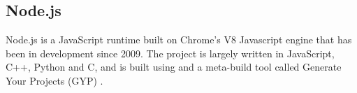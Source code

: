 
















\subsection{Node.js}
\label{sec:eval:node}

Node.js is a JavaScript runtime built on Chrome's V8 Javascript engine that has been in development since 2009.  The project is largely written in JavaScript, C++, Python and C, and is built using \Make and a meta-build tool called Generate Your Projects (GYP) \cite{gyp}.

